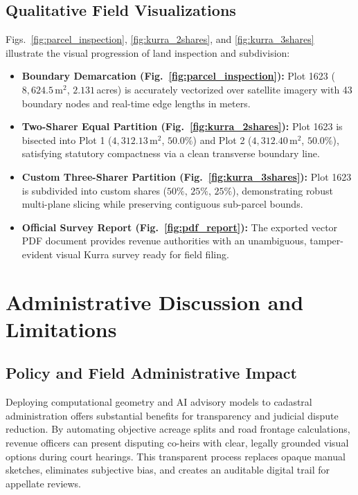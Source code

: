 \documentclass[conference]{IEEEtran}
\begin{document}
\subsection{Qualitative Field Visualizations}
Figs.~\ref{fig:parcel_inspection}, \ref{fig:kurra_2shares}, and \ref{fig:kurra_3shares} illustrate the visual progression of land inspection and subdivision:
\begin{itemize}
    \item \textbf{Boundary Demarcation (Fig.~\ref{fig:parcel_inspection}):} Plot 1623 ($8,624.5\,\text{m}^2$, $2.131$\,acres) is accurately vectorized over satellite imagery with 43 boundary nodes and real-time edge lengths in meters.
    \item \textbf{Two-Sharer Equal Partition (Fig.~\ref{fig:kurra_2shares}):} Plot 1623 is bisected into Plot 1 ($4,312.13\,\text{m}^2$, $50.0\%$) and Plot 2 ($4,312.40\,\text{m}^2$, $50.0\%$), satisfying statutory compactness via a clean transverse boundary line.
    \item \textbf{Custom Three-Sharer Partition (Fig.~\ref{fig:kurra_3shares}):} Plot 1623 is subdivided into custom shares ($50\%$, $25\%$, $25\%$), demonstrating robust multi-plane slicing while preserving contiguous sub-parcel bounds.
    \item \textbf{Official Survey Report (Fig.~\ref{fig:pdf_report}):} The exported vector PDF document provides revenue authorities with an unambiguous, tamper-evident visual Kurra survey ready for field filing.
\end{itemize}

\section{Administrative Discussion and Limitations}

\subsection{Policy and Field Administrative Impact}
Deploying computational geometry and AI advisory models to cadastral administration offers substantial benefits for transparency and judicial dispute reduction. By automating objective acreage splits and road frontage calculations, revenue officers can present disputing co-heirs with clear, legally grounded visual options during court hearings. This transparent process replaces opaque manual sketches, eliminates subjective bias, and creates an auditable digital trail for appellate reviews.
\end{document}
